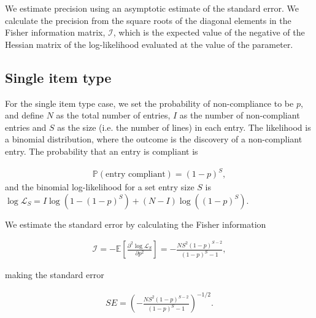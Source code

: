 \documentclass[aoas]{imsart}
\begin{document}
 {We estimate precision using an asymptotic estimate of the standard error. We calculate  the precision from the square roots of the diagonal elements in the Fisher information matrix, $\mathcal{I}$, which is the expected value of the negative of the Hessian matrix of the log-likelihood evaluated at the value of the parameter.}


\subsection{Single item type}
For the single item type case, we set the probability of non-compliance to be \(p\), and define \(N\) as the total number of entries, \(I\) as the number of  {non-compliant entries} and \(S\) as the size (i.e. the number of lines) in each entry. The likelihood is a binomial distribution, where the outcome is  {the discovery of a non-compliant entry}. The probability that an entry is  {compliant} is

\begin{align}
\mathbb{P}(\text{entry compliant}) = (1-p)^S,
\end{align}
and  the binomial log-likelihood for a set entry size $S$ is \(\log\mathcal{L}_S = I\log(1-(1-p)^S) + (N-I)\log((1-p)^S)\).

We estimate the standard error by calculating the Fisher information

\begin{align}
\mathcal{I} = -\mathbb{E}\left[\frac{\partial^2 \log\mathcal{L}_S}{\partial p^2}\right]=
 -\frac{NS^2(1-p)^{S-2}}{(1-p)^S-1}, \label{eq:fisher_information}
\end{align}

making the standard error

\begin{align}
SE = \left(-\frac{NS^2(1-p)^{S-2}}{(1-p)^S-1}\right)^{-1/2}. \label{eq:general_SE_calc}
\end{align}
\end{document}
